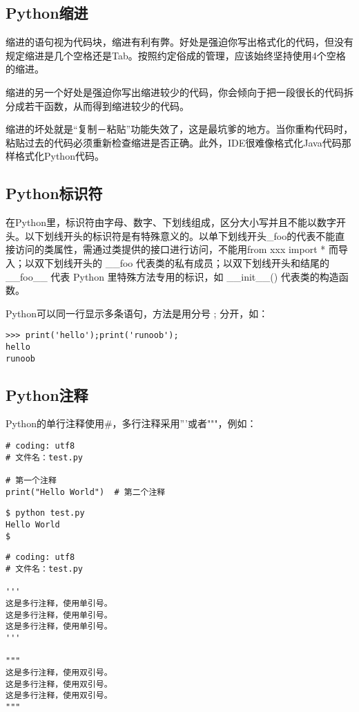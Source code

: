 \subsection{Python缩进}
缩进的语句视为代码块，缩进有利有弊。好处是强迫你写出格式化的代码，但没有规定缩进是几个空格还是Tab。按照约定俗成的管理，应该始终坚持使用4个空格的缩进。

缩进的另一个好处是强迫你写出缩进较少的代码，你会倾向于把一段很长的代码拆分成若干函数，从而得到缩进较少的代码。

缩进的坏处就是“复制－粘贴”功能失效了，这是最坑爹的地方。当你重构代码时，粘贴过去的代码必须重新检查缩进是否正确。此外，IDE很难像格式化Java代码那样格式化Python代码。


\subsection{Python标识符}
在Python里，标识符由字母、数字、下划线组成，区分大小写并且不能以数字开头。以下划线开头的标识符是有特殊意义的。以单下划线开头\_foo的代表不能直接访问的类属性，需通过类提供的接口进行访问，不能用from xxx import * 而导入；以双下划线开头的 \_\_foo 代表类的私有成员；以双下划线开头和结尾的 \_\_foo\_\_ 代表 Python 里特殊方法专用的标识，如 \_\_init\_\_() 代表类的构造函数。

Python可以同一行显示多条语句，方法是用分号 ; 分开，如：
\begin{verbatim}
>>> print('hello');print('runoob');
hello
runoob
\end{verbatim}

\subsection{Python注释}
Python的单行注释使用\#，多行注释采用'''或者"""，例如：
\begin{verbatim}
# coding: utf8
# 文件名：test.py

# 第一个注释
print("Hello World")  # 第二个注释
\end{verbatim}

\begin{verbatim}
$ python test.py
Hello World
$ 
\end{verbatim}


\begin{verbatim}
# coding: utf8
# 文件名：test.py

'''
这是多行注释，使用单引号。
这是多行注释，使用单引号。
这是多行注释，使用单引号。
'''

"""
这是多行注释，使用双引号。
这是多行注释，使用双引号。
这是多行注释，使用双引号。
"""
\end{verbatim}

